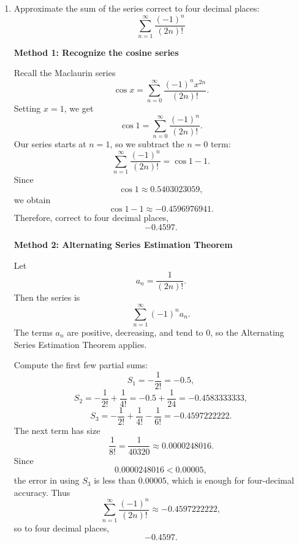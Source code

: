\documentclass[a4paper,12pt,twocolumn]{article}
\newenvironment{solutionbox}{\begin{framed}}{\end{framed}}
\begin{document}
\begin{enumerate}[label=\textbf{\arabic*.}, leftmargin=2em, itemsep=1.2em]
\begin{solutionbox}
If \(p>1\), then \(1-p<0\), so \(2^{k(1-p)}\) decays geometrically and
\[
\frac{2^{k(1-p)}}{k}\le 2^{k(1-p)}.
\]
Hence the condensed series converges.

If \(p=1\), then the condensed series becomes a constant multiple of
\[
\sum_{k=1}^{\infty}\frac{1}{k},
\]
so it diverges.

If \(0\le p<1\), then \(1-p>0\), so
\[
\frac{2^{k(1-p)}}{k}
\]
does not tend to \(0\), and the condensed series diverges.

If \(p<0\), the original terms do not tend to \(0\), so the original series diverges immediately.

\medskip
\textbf{Answer:}
\[
\boxed{\text{The series converges exactly when } p>1.}
\]
\end{solutionbox}

\setcounter{enumi}{40}
\item Approximate the sum of the series correct to four decimal places:
\[
\sum_{n=1}^{\infty}\frac{(-1)^n}{(2n)!}
\]

\begin{solutionbox}
\textbf{Method 1: Recognize the cosine series}

Recall the Maclaurin series
\[
\cos x=\sum_{n=0}^{\infty}\frac{(-1)^n x^{2n}}{(2n)!}.
\]
Setting \(x=1\), we get
\[
\cos 1=\sum_{n=0}^{\infty}\frac{(-1)^n}{(2n)!}.
\]
Our series starts at \(n=1\), so we subtract the \(n=0\) term:
\[
\sum_{n=1}^{\infty}\frac{(-1)^n}{(2n)!}
=
\cos 1-1.
\]
Since
\[
\cos 1\approx 0.5403023059,
\]
we obtain
\[
\cos 1-1\approx -0.4596976941.
\]
Therefore, correct to four decimal places,
\[
\boxed{-0.4597}.
\]
\end{solutionbox}

\begin{solutionbox}
\textbf{Method 2: Alternating Series Estimation Theorem}

Let
\[
a_n=\frac{1}{(2n)!}.
\]
Then the series is
\[
\sum_{n=1}^{\infty}(-1)^n a_n.
\]
The terms \(a_n\) are positive, decreasing, and tend to \(0\), so the Alternating Series Estimation Theorem applies.

Compute the first few partial sums:
\[
S_1=-\frac{1}{2!}=-0.5,
\]
\[
S_2=-\frac{1}{2!}+\frac{1}{4!}
=-0.5+\frac{1}{24}
=-0.4583333333,
\]
\[
S_3=-\frac{1}{2!}+\frac{1}{4!}-\frac{1}{6!}
=-0.4597222222.
\]
The next term has size
\[
\frac{1}{8!}=\frac{1}{40320}\approx 0.0000248016.
\]
Since
\[
0.0000248016<0.00005,
\]
the error in using \(S_3\) is less than \(0.00005\), which is enough for four-decimal accuracy. Thus
\[
\sum_{n=1}^{\infty}\frac{(-1)^n}{(2n)!}\approx -0.4597222222,
\]
so to four decimal places,
\[
\boxed{-0.4597}.
\]
\end{solutionbox}


\end{enumerate}
\end{document}
